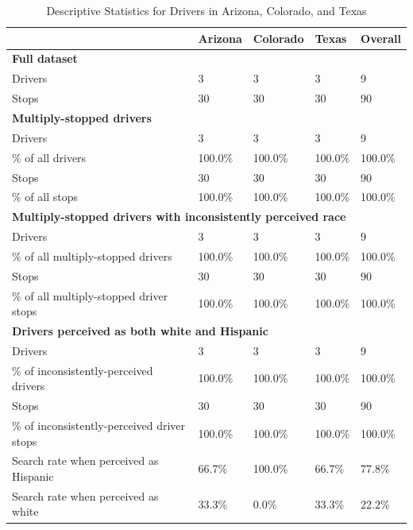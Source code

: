 \begin{table}[ht]
\centering
\caption{Descriptive Statistics for Drivers in Arizona, Colorado, and Texas} 
\label{tab:descriptive_stats}
\begin{tabular*}{1.02\textwidth}{@{}p{6.3cm}llll@{}}
  \toprule
 & \textbf{Arizona} & \textbf{Colorado} & \textbf{Texas} & \textbf{Overall} \\ 
  \midrule
\toprule\multicolumn{5}{l}{\textbf{Full dataset}}\\
\toprule
Drivers & 3 & 3 & 3 & 9 \\ 
  \midrule
Stops & 30 & 30 & 30 & 90 \\ 
   \midrule
\toprule
\multicolumn{5}{l}{\textbf{Multiply-stopped drivers}}\\
\toprule
 Drivers & 3 & 3 & 3 & 9 \\ 
  \midrule
\% of all drivers & 100.0\% & 100.0\% & 100.0\% & 100.0\%\\ \midrule
 Stops & 30 & 30 & 30 & 90 \\ 
  \midrule
\% of all stops & 100.0\% & 100.0\% & 100.0\% & 100.0\%\\\midrule\toprule
\multicolumn{5}{l}{\textbf{Multiply-stopped drivers with inconsistently perceived race}}\\
\toprule
 Drivers & 3 & 3 & 3 & 9 \\ 
  \midrule
\% of all multiply-stopped drivers & 100.0\% & 100.0\% & 100.0\% & 100.0\%\\ \midrule
 Stops & 30 & 30 & 30 & 90 \\ 
  \midrule
\% of all multiply-stopped driver stops & 100.0\% & 100.0\% & 100.0\% & 100.0\%\\\midrule\toprule
\multicolumn{5}{l}{\textbf{Drivers perceived as both white and Hispanic}}\\
\toprule
 Drivers & 3 & 3 & 3 & 9 \\ 
  \midrule
\% of inconsistently-perceived drivers & 100.0\% & 100.0\% & 100.0\% & 100.0\%\\ \midrule
 Stops & 30 & 30 & 30 & 90 \\ 
  \midrule
\% of inconsistently-perceived driver stops & 100.0\% & 100.0\% & 100.0\% & 100.0\%\\ \midrule
 Search rate when perceived as Hispanic & 66.7\% & 100.0\% & 66.7\% & 77.8\% \\ 
   \midrule
 Search rate when perceived as white & 33.3\% & 0.0\% & 33.3\% & 22.2\% \\ 
   \bottomrule
\end{tabular*}
\end{table}
